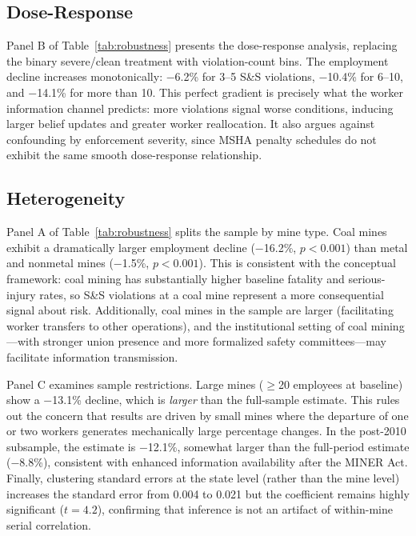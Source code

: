 \documentclass[12pt]{article}
\begin{document}
\subsection{Dose-Response}



Panel B of Table~\ref{tab:robustness} presents the dose-response analysis, replacing the binary severe/clean treatment with violation-count bins. The employment decline increases monotonically: $-$6.2\% for 3--5 S\&S violations, $-$10.4\% for 6--10, and $-$14.1\% for more than 10. This perfect gradient is precisely what the worker information channel predicts: more violations signal worse conditions, inducing larger belief updates and greater worker reallocation. It also argues against confounding by enforcement severity, since MSHA penalty schedules do not exhibit the same smooth dose-response relationship.

\subsection{Heterogeneity}

Panel A of Table~\ref{tab:robustness} splits the sample by mine type. Coal mines exhibit a dramatically larger employment decline ($-$16.2\%, $p < 0.001$) than metal and nonmetal mines ($-$1.5\%, $p < 0.001$). This is consistent with the conceptual framework: coal mining has substantially higher baseline fatality and serious-injury rates, so S\&S violations at a coal mine represent a more consequential signal about risk. Additionally, coal mines in the sample are larger (facilitating worker transfers to other operations), and the institutional setting of coal mining---with stronger union presence and more formalized safety committees---may facilitate information transmission.

Panel C examines sample restrictions. Large mines ($\geq$20 employees at baseline) show a $-$13.1\% decline, which is \textit{larger} than the full-sample estimate. This rules out the concern that results are driven by small mines where the departure of one or two workers generates mechanically large percentage changes. In the post-2010 subsample, the estimate is $-$12.1\%, somewhat larger than the full-period estimate ($-$8.8\%), consistent with enhanced information availability after the MINER Act. Finally, clustering standard errors at the state level (rather than the mine level) increases the standard error from 0.004 to 0.021 but the coefficient remains highly significant ($t = 4.2$), confirming that inference is not an artifact of within-mine serial correlation.
\end{document}
